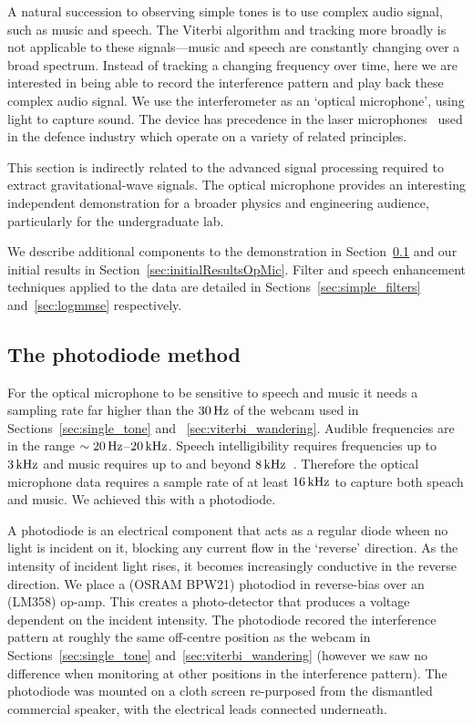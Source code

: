 \documentclass[paper-main.tex]{subfiles}
\begin{document}

A natural succession to observing simple tones is to use complex audio signal, such as music and speech. 
The Viterbi algorithm and tracking more broadly is not applicable to these signals---music and speech are constantly changing over a broad spectrum. 
Instead of tracking a changing frequency over time, here we are interested in being able to record the interference pattern and play back these complex audio signal. 
We use the interferometer as an `optical microphone', using light to capture sound. 
The device has precedence in the laser microphones~\cite{laser_microphone} used in the defence industry which operate on a variety of related principles.

This section is indirectly related to the advanced signal processing required to extract gravitational-wave signals. 
The optical microphone provides an interesting independent demonstration for a broader physics and engineering audience, particularly for the undergraduate lab. 

We describe additional components to the demonstration in Section~\ref{sec:photodiode} and our initial results in Section~\ref{sec:initialResultsOpMic}.
Filter and speech enhancement techniques applied to the data are detailed in Sections~\ref{sec:simple_filters} and~\ref{sec:logmmse} respectively.


\subsection{The photodiode method}
\label{sec:photodiode}

For the optical microphone to be sensitive to speech and music it needs a sampling rate far higher than the $30\,{\rm Hz}$ of the webcam used in Sections~\ref{sec:single_tone} and ~\ref{sec:viterbi_wandering}. 
Audible frequencies are in the range $\sim 20\,{\rm Hz}$--$20\,{\rm kHz}$. 
Speech intelligibility requires frequencies up to $3\,{\rm kHz}$ and music requires up to and beyond $8\,{\rm kHz}$~\cite{speech_intelligibility}. 
Therefore the optical microphone data requires a sample rate of at least $16\,{\rm kHz}$ to capture both speach and music. 
We achieved this with a photodiode.


A photodiode is an electrical component that acts as a regular diode wheen no light is incident on it, blocking any current flow in the `reverse' direction.
As the intensity of incident light rises, it becomes increasingly conductive in the reverse direction. 
We place a (OSRAM BPW21) photodiod in reverse-bias over an (LM358) op-amp. 
This creates a photo-detector that produces a voltage dependent on the incident intensity. 
The photodiode recored the interference pattern at roughly the same off-centre position as the webcam in Sections~\ref{sec:single_tone} and~\ref{sec:viterbi_wandering} (however we saw no difference when monitoring at other positions in the interference pattern).
The photodiode was mounted on a cloth screen re-purposed from the dismantled commercial speaker, with the electrical leads connected underneath. 
\end{document}
